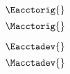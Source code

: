 

\begin{landscape}

\linespread{1}


\sectionsep{}

{
  \begin{equation} \label{eq:E_acct_orig}
  \Eacctorig{}
  \end{equation}
}
{
  \begin{equation} \label{eq:M_acct_orig}
  \Macctorig{}
  \end{equation}
}

\sectionsep{}

{
  \begin{equation} \label{eq:E_acct_adev}
  \Eacctadev{}
  \end{equation}
}
{
  \begin{equation} \label{eq:M_acct_adev}
  \Macctadev{}
  \end{equation}
}

\sectionsep{}

  \derivsection{}
{
    ~
    
}
\end{landscape}
